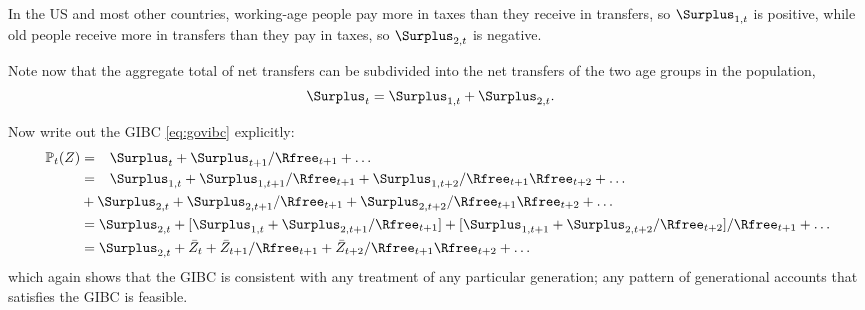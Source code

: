 \documentclass{handout}
\begin{document}
In the US and most other countries, working-age people pay more in 
taxes than they receive in transfers, so $\Surplus_{1,t}$ is positive, while 
old people receive more in transfers than they pay in taxes, so 
$\Surplus_{2,t}$ is negative.

Note now that the aggregate total of net transfers can be subdivided 
into the net transfers of the two age groups in the population,
\begin{equation}\begin{gathered}\begin{aligned}
        \Surplus_{t} & =  \Surplus_{1,t}+\Surplus_{2,t}.
\end{aligned}\end{gathered}\end{equation}

Now write out the GIBC \eqref{eq:govibc} explicitly:
\begin{equation}\begin{gathered}\begin{aligned}
        \mathbb{P}_{t}(Z) & =  \phantom{+} \Surplus_{t}+\Surplus_{t+1}/\Rfree_{t+1}+ \ldots \\
         & =  \phantom{+} \Surplus_{1,t}+\Surplus_{1,t+1}/\Rfree_{t+1}+\Surplus_{1,t+2}/\Rfree_{t+1}\Rfree_{t+2}+\ldots \\
         &    +\Surplus_{2,t}+\Surplus_{2,t+1}/\Rfree_{t+1}+\Surplus_{2,t+2}/\Rfree_{t+1}\Rfree_{t+2}+\ldots 
         \nonumber \\
         & =  \Surplus_{2,t}+[\Surplus_{1,t}+\Surplus_{2,t+1}/\Rfree_{t+1}]+[\Surplus_{1,t+1}+\Surplus_{2,t+2}/\Rfree_{t+2}]/\Rfree_{t+1} + \ldots
\\       & =  \Surplus_{2,t}+\bar{Z}_{t}+\bar{Z}_{t+1}/\Rfree_{t+1}+\bar{Z}_{t+2}/\Rfree_{t+1}\Rfree_{t+2}+\ldots
\end{aligned}\end{gathered}\end{equation}
which again shows that the GIBC is consistent with any treatment of 
any particular generation; any pattern of generational accounts that 
satisfies the GIBC is feasible.
\end{document}
